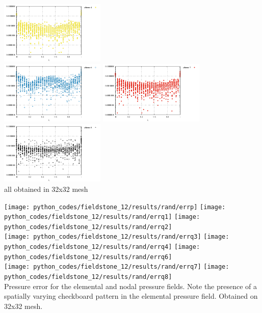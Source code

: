 \begin{center}
\includegraphics[width=5cm]{python_codes/fieldstone_12/results/rand/q4_error}\\
\includegraphics[width=5cm]{python_codes/fieldstone_12/results/rand/q6_error}
\includegraphics[width=5cm]{python_codes/fieldstone_12/results/rand/q7_error}
\includegraphics[width=5cm]{python_codes/fieldstone_12/results/rand/q8_error}\\
{\captionfont all obtained in 32x32 mesh}
\end{center}

\begin{center}
\texttt{[image: python\_codes/fieldstone\_12/results/rand/errp]}
\texttt{[image: python\_codes/fieldstone\_12/results/rand/errq1]}
\texttt{[image: python\_codes/fieldstone\_12/results/rand/errq2]}\\
\texttt{[image: python\_codes/fieldstone\_12/results/rand/errq3]}
\texttt{[image: python\_codes/fieldstone\_12/results/rand/errq4]}
\texttt{[image: python\_codes/fieldstone\_12/results/rand/errq6]}\\
\texttt{[image: python\_codes/fieldstone\_12/results/rand/errq7]}
\texttt{[image: python\_codes/fieldstone\_12/results/rand/errq8]}\\
{\captionfont Pressure error for the elemental and nodal pressure fields. Note 
the presence of a spatially varying checkboard pattern in the elemental pressure field.
Obtained on 32x32 mesh.}
\end{center}


